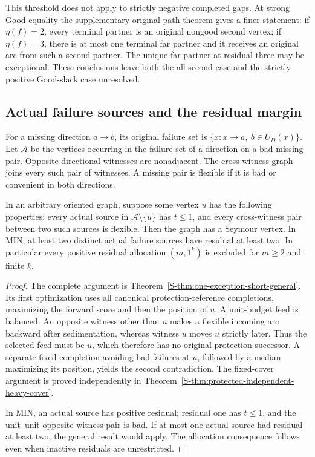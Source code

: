 This threshold does not apply to strictly negative completed gaps. At strong
Good equality the supplementary original path theorem gives a finer statement:
if $\eta(f)=2$, every terminal partner is an original nongood second vertex;
if $\eta(f)=3$, there is at most one terminal far partner and it receives an
original arc from such a second partner. The unique far partner at residual
three may be exceptional. These conclusions leave both the all-second case
and the strictly positive Good-slack case unresolved.

\subsection{Actual failure sources and the residual margin}
For a missing direction $a\to b$, its original failure set is
$\{x:x\to a,\ b\in U_D(x)\}$. Let $\mathcal A$ be the vertices occurring
in the failure set of a direction on a bad missing pair. Opposite directional
witnesses are nonadjacent. The cross-witness graph joins every such pair of
witnesses. A missing pair is flexible if it is bad or convenient in both
directions.

\begin{theorem}\label{thm:paper-one-exception}
In an arbitrary oriented graph, suppose some vertex $u$ has the following
properties: every actual source in $\mathcal A\setminus\{u\}$ has $t\le1$,
and every cross-witness pair between two such sources is flexible. Then the
graph has a Seymour vertex. In MIN, at least two distinct actual failure
sources have residual at least two. In particular every positive residual
allocation $(m,1^k)$ is excluded for $m\ge2$ and finite $k$.
\end{theorem}
\begin{proof}
The complete argument is Theorem~\ref{S-thm:one-exception-short-general}.
Its first optimization uses all canonical protection-reference completions,
maximizing the forward score and then the position of $u$. A unit-budget
feed is balanced. An opposite witness other than $u$ makes a flexible
incoming arc backward after sedimentation, whereas witness $u$ moves $u$
strictly later. Thus the selected feed must be $u$, which therefore has
no original protection successor. A separate fixed completion avoiding
bad failures at $u$, followed by a median maximizing its position, yields
the second contradiction. The fixed-cover argument is proved independently
in Theorem~\ref{S-thm:protected-independent-heavy-cover}.

In MIN, an actual source has positive residual; residual one has $t\le1$,
and the unit--unit opposite-witness pair is bad. If at most one actual
source had residual at least two, the general result would apply. The
allocation consequence follows even when inactive residuals are unrestricted.
\end{proof}

